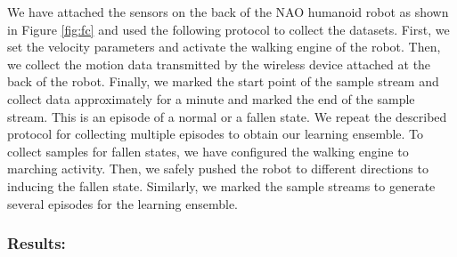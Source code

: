 \documentclass{IEEEtran}
\begin{document}
We have attached the sensors on the back of the NAO humanoid robot as shown in Figure \ref{fig:fc} 
and used the following protocol to collect the datasets. First, we set the velocity 
parameters and activate the walking engine of the robot. Then, we collect the motion data 
transmitted by the wireless device attached at the back of the robot. Finally, we marked the start 
point of the sample stream and collect data approximately for a minute and marked the end of the 
sample stream. This is an episode of a normal  or a fallen state. We repeat the described 
protocol for collecting multiple episodes to obtain our learning ensemble. To collect samples for 
fallen states, we have configured the walking engine to marching activity. Then, we safely pushed 
the robot to different directions to inducing the fallen state. Similarly, we marked the sample 
streams to generate several episodes for the learning ensemble.    
%


\subsubsection{Results:}
\end{document}
